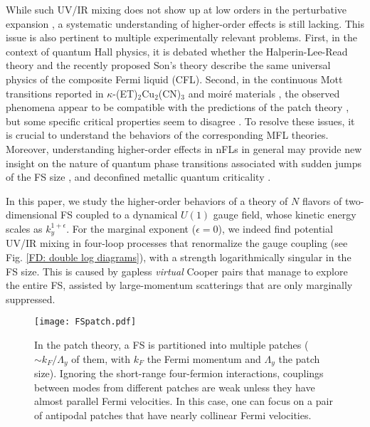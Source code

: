 \documentclass[prl,amsmath,amssymb, notitlepage, twocolumn,
nofootinbib,
superscriptaddress,
longbibliography
]{revtex4-1}
\begin{document}
While such UV/IR mixing does not show up at low orders in the perturbative expansion \cite{Mross2010, Metlitski2014}, 
a systematic understanding of higher-order effects is still lacking.
This issue is also pertinent to multiple experimentally relevant problems.
First, in the context of quantum Hall physics, it is debated whether the Halperin-Lee-Read theory \cite{HLR} and the recently proposed Son's theory \cite{Son2015}
describe the same 
universal physics 
of the composite Fermi liquid (CFL).
Second, in the continuous Mott transitions reported in {\ensuremath{\kappa}}-(ET)$_{2}$Cu$_{2}$(CN)$_{3}$ \cite{Kurosaki2005, Furukawa2015} and moir\'e materials \cite{Li2021, Ghiotto2021},
the observed phenomena appear to be compatible with the predictions of the patch theory \cite{Senthil2008}, but some specific critical properties seem to disagree \cite{Li2021}. 
To resolve these issues, it is crucial to understand the behaviors of the corresponding MFL theories.
Moreover, understanding higher-order effects in nFLs in general may provide new insight on
the nature of quantum phase transitions associated with sudden jumps of the FS size \cite{Onuki2005,Fang2020}, 
and deconfined metallic quantum criticality
\cite{Zou2020, Zou2020a, Zhang2020, Zhang2020a}.

In this paper, we study the higher-order behaviors of a theory of
$N$ flavors of two-dimensional FS coupled to a dynamical $U(1)$ gauge field, whose kinetic energy scales as $k_y^{1+\epsilon}$.
For the marginal exponent ($\epsilon=0$),
we indeed find potential UV/IR mixing in four-loop processes
that renormalize the gauge coupling (see Fig. \ref{FD: double log diagrams}), with a strength logarithmically singular
in the FS size.
This is caused by gapless {\it virtual} Cooper pairs that manage to explore the entire FS, assisted by large-momentum scatterings that are only marginally suppressed.


\begin{figure}[h]
\centering
\texttt{[image: FSpatch.pdf]}
\caption{
In the patch theory, a FS is partitioned into multiple patches ($\sim k_F/\Lambda_y$ of them, with $k_F$ the Fermi momentum and $\Lambda_y$ the patch size). Ignoring the short-range four-fermion interactions, 
couplings between modes from different patches are weak unless they have almost parallel Fermi velocities.
In this case,
one can focus on a pair of antipodal patches 
that have nearly collinear Fermi velocities.
}
\label{fig: FSpatch}
\end{figure}
\end{document}
